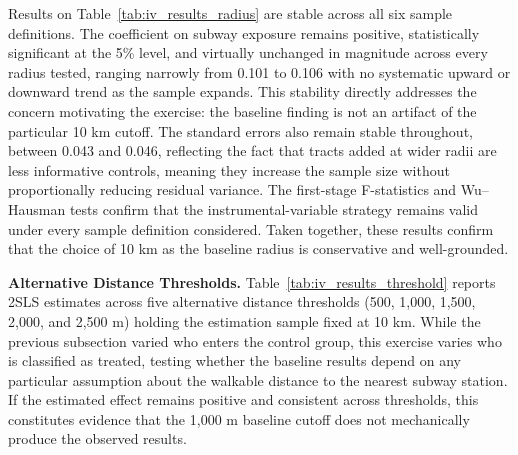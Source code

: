 Results on Table~\ref{tab:iv_results_radius} are stable across all six sample definitions. The coefficient on subway exposure remains positive, statistically significant at the 5\% level, and virtually unchanged in magnitude across every radius tested, ranging narrowly from 0.101 to 0.106 with no systematic upward or downward trend as the sample expands. This stability directly addresses the concern motivating the exercise: the baseline finding is not an artifact of the particular 10 km cutoff. The standard errors also remain stable throughout, between 0.043 and 0.046, reflecting the fact that tracts added at wider radii are less informative controls, meaning they increase the sample size without proportionally reducing residual variance. The first-stage F-statistics and Wu--Hausman tests confirm that the instrumental-variable strategy remains valid under every sample definition considered. Taken together, these results confirm that the choice of 10 km as the baseline radius is conservative and well-grounded.
\vspace{0.75cm}

\noindent
\textbf{Alternative Distance Thresholds.} Table~\ref{tab:iv_results_threshold} reports 2SLS estimates across five alternative distance thresholds (500, 1,000, 1,500, 2,000, and 2,500 m) holding the estimation sample fixed at 10 km. While the previous subsection varied who enters the control group, this exercise varies who is classified as treated, testing whether the baseline results depend on any particular assumption about the walkable distance to the nearest subway station. If the estimated effect remains positive and consistent across thresholds, this constitutes evidence that the 1,000 m baseline cutoff does not mechanically produce the observed results.


